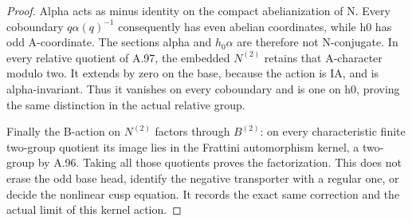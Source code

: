 \begin{proof}
Alpha acts as minus identity on the compact abelianization of N.
Every coboundary \(q\alpha(q)^{-1}\) consequently has even
abelian coordinates, while h0 has odd A-coordinate. The sections
alpha and \(h_0\alpha\) are therefore not N-conjugate. In every
relative quotient of A.97, the embedded \(N^{(2)}\) retains that
A-character modulo two. It extends by zero on the base, because
the action is IA, and is alpha-invariant. Thus it vanishes on
every coboundary and is one on h0, proving the same distinction
in the actual relative group.

Finally the B-action on \(N^{(2)}\) factors through \(B^{(2)}\):
on every characteristic finite two-group quotient its image lies
in the Frattini automorphism kernel, a two-group by A.96.
Taking all those quotients proves the factorization. This does not
erase the odd base head, identify the negative transporter with
a regular one, or decide the nonlinear cusp equation. It records
the exact same correction and the actual limit of this kernel action.
\end{proof}
